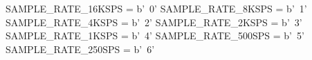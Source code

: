 \begin{python}
SAMPLE_RATE_16KSPS = b'~0'
SAMPLE_RATE_8KSPS = b'~1'
SAMPLE_RATE_4KSPS = b'~2'
SAMPLE_RATE_2KSPS = b'~3'
SAMPLE_RATE_1KSPS = b'~4'
SAMPLE_RATE_500SPS = b'~5'
SAMPLE_RATE_250SPS = b'~6'
\end{python}